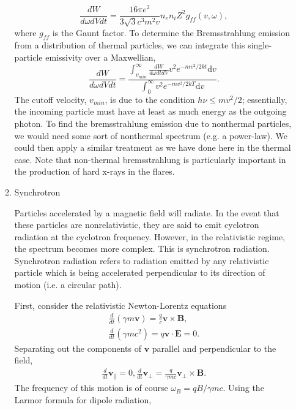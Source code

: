 \begin{enumerate}
\begin{enumerate}
				\begin{equation}
					\frac{dW}{d\omega dVdt} = \frac{16\pi e^2}{3\sqrt{3}c^3m^2v}n_en_iZ^2g_{ff}(v,\omega),
				\end{equation}
				where $g_{ff}$ is the Gaunt factor. To determine the Bremsstrahlung emission from a distribution of thermal particles, we can integrate this single-particle emissivity over a Maxwellian,
				\begin{equation}
					\frac{dW}{d\omega dV dt} = \frac{\int_{v_{min}}^{\infty}\frac{dW}{d\omega dt dV}v^2e^{-mv^2/2kt}\mathrm{d}v}{\int_0^{\infty}v^2e^{-mv^2/2kT}\mathrm{d}v}.
				\end{equation}
				The cutoff velocity, $v_{min}$, is due to the condition $h\nu\le mv^2/2$; essentially, the incoming particle must have at least as much energy as the outgoing photon. To find the bremsstrahlung emission due to nonthermal particles, we would need some sort of nonthermal spectrum (e.g. a power-law). We could then apply a similar treatment as we have done here in the thermal case. Note that non-thermal bremsstrahlung is particularly important in the production of hard x-rays in the flares. 
				\item{Synchrotron}
				\par Particles accelerated by a magnetic field will radiate. In the event that these particles are nonrelativistic, they are said to emit cyclotron radiation at the cyclotron frequency. However, in the relativistic regime, the spectrum becomes more complex. This is synchrotron radiation. Synchrotron radiation refers to radiation emitted by any relativistic particle which is being accelerated perpendicular to its direction of motion (i.e. a circular path). 
				\par First, consider the relativistic Newton-Lorentz equations
				\begin{align}
					\frac{d}{dt}(\gamma m\mathbf{v}) = \frac{q}{c}\mathbf{v}\times\mathbf{B}, \\
					\frac{d}{dt}(\gamma mc^2)=q\mathbf{v}\cdot\mathbf{E}=0.
				\end{align}
				Separating out the components of $\mathbf{v}$ parallel and perpendicular to the field,
				\begin{align}
					\frac{d}{dt}\mathbf{v}_{\parallel} = 0,
					\frac{d}{dt}\mathbf{v}_{\perp} = \frac{q}{\gamma mc}\mathbf{v}_{\perp}\times\mathbf{B}.
				\end{align}
				The frequency of this motion is of course $\omega_B=qB/\gamma mc$. Using the Larmor formula for dipole radiation,

\end{enumerate}
\end{enumerate}

